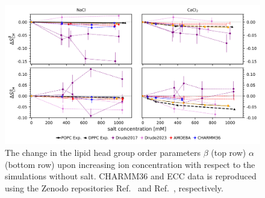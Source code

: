 \documentclass[journal=jacsat,manuscript=article,layout=singlecolumn]{achemso}
\begin{document}
\begin{figure}[!hbt]
	\centering
	\includegraphics{Figures/order_parameter_change.png}
	\caption{The change in the lipid head group order parameters $\beta$ (top row) $\alpha$ (bottom row) upon increasing ion concentration with respect to the simulations without salt. CHARMM36 and ECC data is reproduced using the Zenodo repositories Ref.~\cite{ollila_2015_32496, ollila_2015_32497, ollila_2015_32498, nencini_ricky_2019_3434396} and Ref.~\cite{melcr_josef_2017_3335503}, respectively.}
	\label{fig:popc_order_parameter_change}
\end{figure}
\end{document}
